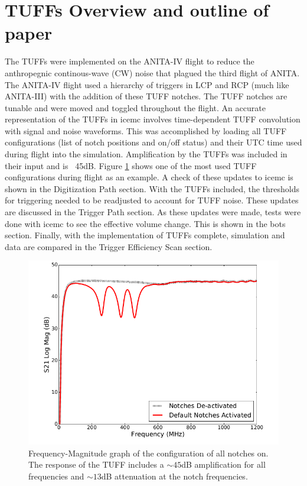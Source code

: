 \documentclass[12pt]{article}
\theoremstyle{plain}
\theoremstyle{definition}
\begin{document}
\section{TUFFs Overview and outline of paper}
\hspace{0.2in} 
The TUFFs were implemented on the ANITA-IV flight to reduce the anthropegnic continous-wave (CW) noise that plagued the third flight of ANITA. The ANITA-IV flight used a hierarchy of triggers in LCP and RCP (much like ANITA-III) with the addition of these TUFF notches. The TUFF notches are tunable and were moved and toggled throughout the flight. An accurate representation of the TUFFs in icemc involves time-dependent TUFF convolution with signal and noise waveforms. This was accomplished by loading all TUFF configurations (list of notch positions and on/off status) and their UTC time used during flight into the simulation. Amplification by the TUFFs was included in their input and is ~45dB. Figure \ref{fig:tuffexample} shows one of the most used TUFF configurations during flight as an example. A check of these updates to icemc is shown in the Digitization Path section. With the TUFFs included, the thresholds for triggering needed to be readjusted to account for TUFF noise. These updates are discussed in the Trigger Path section. As these updates were made, tests were done with icemc to see the effective volume change. This is shown in the bots section. Finally, with the implementation of TUFFs complete, simulation and data are compared in the Trigger Efficiency Scan section. 
\begin{figure}
    \centering
	\includegraphics[scale=0.35]{"config_P_response_freq"}
	\caption{Frequency-Magnitude graph of the configuration of all notches on. The response of the TUFF includes a $\sim45$dB amplification for all frequencies and $\sim13$dB attenuation at the notch frequencies. }
\label{fig:tuffexample}
\end{figure}
\end{document}
